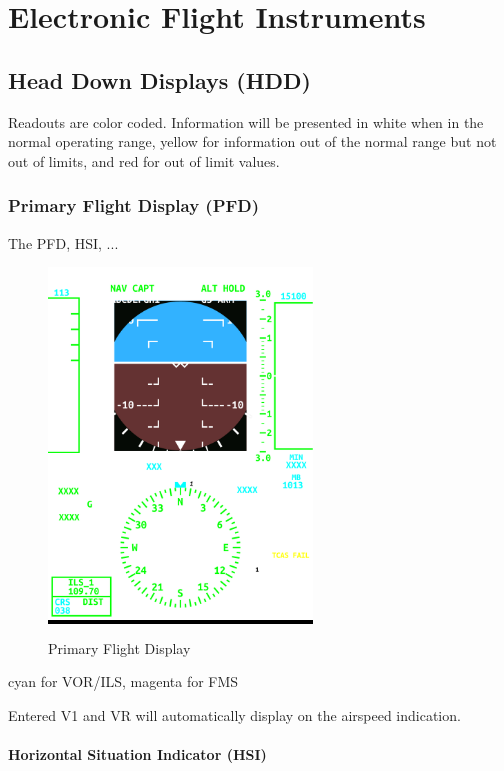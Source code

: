 \part{Electronic Flight Instruments}

\chapter{Head Down Displays (HDD)}
\label{chap:hdd}

Readouts are color coded. Information will be presented in white when in the normal operating range, yellow for information out of the normal range but not out of limits, and red for out of limit values.

\newpage
\section{Primary Flight Display (PFD)}
\label{sec:pfd}

The \gls{PFD}, \gls{HSI}, ...

\begin{figure}[h]
  \centering
  \colorbox{black}{\includegraphics[width=7cm]{figures/hdd/PFD}}
  \caption{Primary Flight Display}
\end{figure}

cyan for VOR/ILS, magenta for FMS

Entered V1 and VR will automatically display on the airspeed indication.

\subsection{Horizontal Situation Indicator (HSI)}
\label{sec:hsi}


